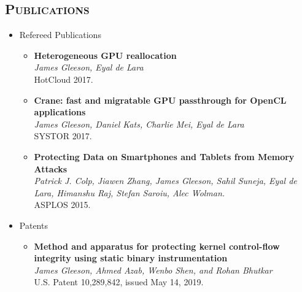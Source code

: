 \documentclass[letterpaper,11pt]{article}
\newcommand{\heading}[1]{
    \textsc{\textbf{#1}}
}
\newcommand*\resheading[1]{\subsection*{\heading{#1}}\vspace{0.3em}\nopagebreak[4]}
\newcommand{\resitem}[1]{\item #1 \vspace{-2pt}}
\newcommand{\ressubheadingnodate}[1]{
		#1 \\
}
\begin{document}
\resheading{Publications}
\begin{itemize}
\item

	\ressubheadingnodate{Refereed Publications}
	\begin{itemize}
        \resitem{
            \textbf{Heterogeneous GPU reallocation} \\
            \textit{James Gleeson, Eyal de Lara} \\
            HotCloud 2017.
        }
        \resitem{
            \textbf{Crane: fast and migratable GPU passthrough for OpenCL applications} \\
            \textit{James Gleeson, Daniel Kats, Charlie Mei, Eyal de Lara} \\
            SYSTOR 2017.
        }
		\resitem{
            \textbf{Protecting Data on Smartphones and Tablets from Memory Attacks} \\
            \textit{Patrick J. Colp, Jiawen Zhang, James Gleeson, Sahil Suneja, Eyal de Lara, Himanshu Raj, Stefan Saroiu, Alec Wolman.} \\
            ASPLOS 2015.
        }
	\end{itemize}
    \item
	\ressubheadingnodate{Patents}
	\begin{itemize}
        \resitem{
            \textbf{Method and apparatus for protecting kernel control-flow integrity using static binary instrumentation} \\
            \textit{James Gleeson, Ahmed Azab, Wenbo Shen, and Rohan Bhutkar} \\
            U.S. Patent 10,289,842, issued May 14, 2019.
        }
	\end{itemize}

\end{itemize}
\end{document}
